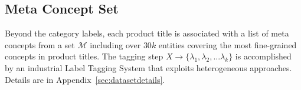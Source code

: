 \subsection{Meta Concept Set}
\label{sec: dataset}
Beyond the category labels, each product title is associated with a list of meta concepts from a set $\mathcal{M}$ including over $30k$ entities covering the most fine-grained concepts in product titles. 
The tagging step $X \rightarrow \{\lambda_1, \lambda_2, ... \lambda_k\}$ is accomplished by an industrial Label Tagging System that exploits heterogeneous approaches.
Details are in Appendix~\ref{sec:datasetdetails}.
